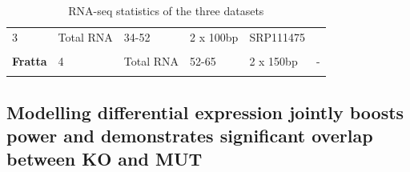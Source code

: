 \begin{longtable}[]{@{}llllll@{}}
\begin{minipage}[t]{0.14\columnwidth}
		{3}\strut
	\end{minipage} & \begin{minipage}[t]{0.14\columnwidth}\raggedright\strut
		{Total RNA}\strut
	\end{minipage} & \begin{minipage}[t]{0.14\columnwidth}\raggedright\strut
		{34-52}\strut
	\end{minipage} & \begin{minipage}[t]{0.14\columnwidth}\raggedright\strut
		{2 x 100bp}\strut
	\end{minipage} & \begin{minipage}[t]{0.14\columnwidth}\raggedright\strut
		{SRP111475}\strut
	\end{minipage}\tabularnewline \\
	\begin{minipage}[t]{0.14\columnwidth}\raggedright\strut
		{\textbf{Fratta} }\strut
	\end{minipage} & \begin{minipage}[t]{0.14\columnwidth}\raggedright\strut
		{4}\strut
	\end{minipage} & \begin{minipage}[t]{0.14\columnwidth}\raggedright\strut
		{Total RNA}\strut
	\end{minipage} & \begin{minipage}[t]{0.14\columnwidth}\raggedright\strut
		{52-65}\strut
	\end{minipage} & \begin{minipage}[t]{0.14\columnwidth}\raggedright\strut
		{2 x 150bp}\strut
	\end{minipage} & \begin{minipage}[t]{0.14\columnwidth}\raggedright\strut
		{-}\strut
	\end{minipage}\tabularnewline
	\caption{RNA-seq statistics of the three datasets}
	\label{tab:fus_sequencing}
\end{longtable}




\subsection{Modelling differential expression jointly boosts power and demonstrates significant overlap between KO and MUT}



